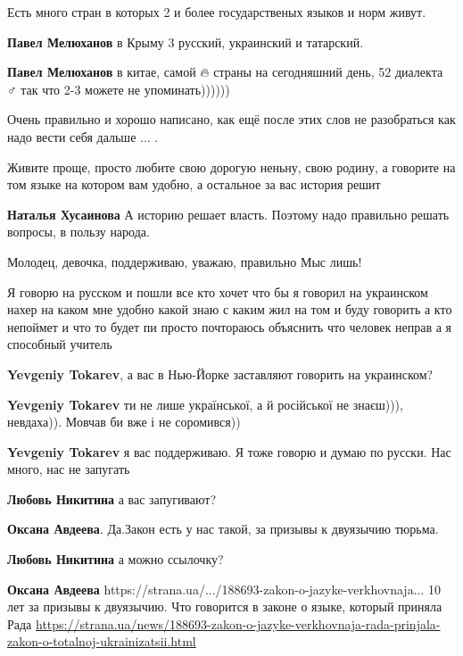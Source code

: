 \begin{itemize}
Есть много стран в которых 2 и более государственых языков и норм живут.

\textbf{Павел Мелюханов} в Крыму 3 русский, украинский и татарский.

\textbf{Павел Мелюханов} в китае, самой 🔥 страны на сегодняшний день, 52
диалекта 🤷♂️ так что 2-3 можете не упоминать))))))

Очень правильно и хорошо написано, как ещё после этих слов не разобраться как
надо вести себя дальше ... .


Живите проще, просто любите свою дорогую неньну, свою родину, а говорите на том
языке на котором вам удобно, а остальное за вас история решит

\textbf{Наталья Хусаинова} А историю решает власть. Поэтому надо правильно
решать вопросы, в пользу народа.


Молодец, девочка, поддерживаю, уважаю, правильно Мыс лишь!


Я говорю на русском и пошли все кто хочет что бы я говорил на украинском нахер
на каком мне удобно какой знаю с каким жил на том и буду говорить а кто
непоймет и что то будет пи просто почтораюсь объяснить что человек неправ а я
способный учитель

\begin{itemize}
\textbf{Yevgeniy Tokarev}, а вас в Нью-Йорке заставляют говорить на украинском?

\textbf{Yevgeniy Tokarev} ти не лише української, а й російської не знаєш))), невдаха)). Мовчав би вже і не соромився))

\textbf{Yevgeniy Tokarev} я вас поддерживаю. Я тоже говорю и думаю по русски. Нас много, нас не запугать

\textbf{Любовь Никитина} а вас запугивают?

\textbf{Оксана Авдеева}. Да.Закон есть у нас такой, за призывы к двуязычию тюрьма.

\textbf{Любовь Никитина} а можно ссылочку?

\textbf{Оксана Авдеева} https://strana.ua/.../188693-zakon-o-jazyke-verkhovnaja...
10 лет за призывы к двуязычию. Что говорится в законе о языке, который приняла Рада
\url{https://strana.ua/news/188693-zakon-o-jazyke-verkhovnaja-rada-prinjala-zakon-o-totalnoj-ukrainizatsii.html}


\end{itemize}
\end{itemize}
